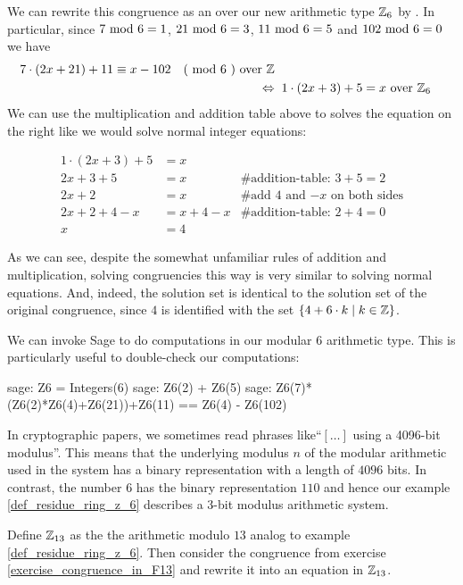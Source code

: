 \begin{example} 
We can rewrite this congruence as an  over our new arithmetic type $\mathbb{Z}_6$ by . In particular, since $7 \text{ mod } 6= 1$, $21 \text{ mod } 6= 3$, $11 \text{ mod } 6= 5$ and $102 \text{ mod } 6= 0$ we have
\begin{align*}
7\cdot(2x+21) + 11 \equiv x-102 \quad \text{( mod } 6 \text{ )} \text{ over } \mathbb{Z}\\
\Leftrightarrow & \; \; 1\cdot (2x+3) + 5 = x \text{ over } \mathbb{Z}_6
\end{align*}
We can use the multiplication and addition table above to solves the equation on the right like we would solve normal integer equations:

\begin{align*}
1\cdot (2x+3) + 5 &= x & \text{ }\\
2x+3 + 5 &= x & \text{\# addition-table: } 3+5 = 2 \\
2x+2 &= x & \text{\# add 4 and $-x$ on both sides} \\
2x+2 +4 -x &= x + 4 -x & \text{\# addition-table: } 2+4 = 0 \\
x &= 4 &
\end{align*}

As we can see, despite the somewhat unfamiliar rules of addition and multiplication, solving congruencies this way is very similar to solving normal equations. And, indeed, the solution set is identical to the solution set of the original congruence, since $4$ is identified with the set $\{4+6\cdot k\;|\; k\in\mathbb{Z}\}$.

We can invoke Sage to do computations in our modular $6$ arithmetic type. This is particularly useful to double-check our computations:
\begin{sagecommandline}
sage: Z6 = Integers(6)
sage: Z6(2) + Z6(5)
sage: Z6(7)*(Z6(2)*Z6(4)+Z6(21))+Z6(11) == Z6(4) - Z6(102)
\end{sagecommandline}
\end{example}

\begin{remark} In cryptographic papers, we sometimes read phrases like``$[\ldots]$ using a 4096-bit modulus''. This means that the underlying modulus $n$ of the modular arithmetic used in the system has a binary representation with a length of $4096$ bits. In contrast, the number $6$ has the binary representation $110$ and hence our example \ref{def_residue_ring_z_6}
 describes a $3$-bit modulus arithmetic system.
\end{remark}
\begin{exercise}
Define $\mathbb{Z}_{13}$ as the the arithmetic modulo $13$ analog to example \ref{def_residue_ring_z_6}. Then consider the congruence from exercise \ref{exercise_congruence_in_F13} and rewrite it into an equation in $\mathbb{Z}_{13}$.
\end{exercise}

